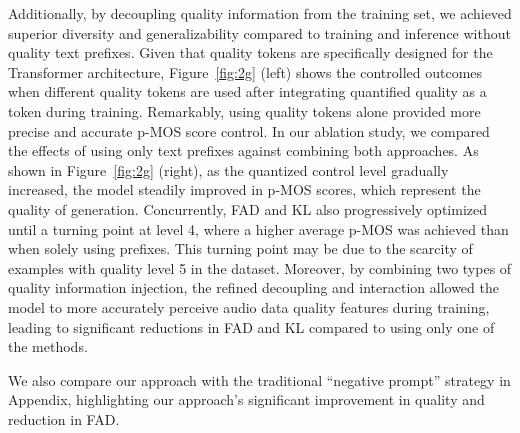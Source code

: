 Additionally, by decoupling quality information from the training set, we achieved superior diversity and generalizability compared to training and inference without quality text prefixes. Given that quality tokens are specifically designed for the Transformer architecture, Figure~\ref{fig:2g} (left) shows the controlled outcomes when different quality tokens are used after integrating quantified quality as a token during training. Remarkably, using quality tokens alone provided more precise and accurate p-MOS score control.
In our ablation study, we compared the effects of using only text prefixes against combining both approaches. As shown in Figure~\ref{fig:2g} (right), as the quantized control level gradually increased, the model steadily improved in p-MOS scores, which represent the quality of generation. Concurrently, FAD and KL also progressively optimized until a turning point at level 4, where a higher average p-MOS was achieved than when solely using prefixes. This turning point may be due to the scarcity of examples with quality level 5 in the dataset. Moreover, by combining two types of quality information injection, the refined decoupling and interaction allowed the model to more accurately perceive audio data quality features during training, leading to significant reductions in FAD and KL compared to using only one of the methods.

We also compare our approach with the traditional ``negative prompt'' strategy in Appendix, highlighting our approach's significant improvement in quality and reduction in FAD.
